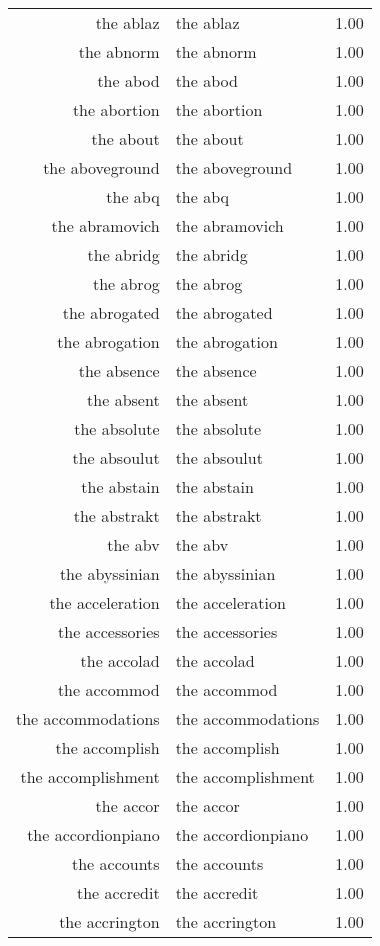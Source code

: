 \begin{table}[ht]
\begin{tabular}{rlr}
  the ablaz & the ablaz & 1.00 \\ 
  the abnorm & the abnorm & 1.00 \\ 
  the abod & the abod & 1.00 \\ 
  the abortion & the abortion & 1.00 \\ 
  the about & the about & 1.00 \\ 
  the aboveground & the aboveground & 1.00 \\ 
  the abq & the abq & 1.00 \\ 
  the abramovich & the abramovich & 1.00 \\ 
  the abridg & the abridg & 1.00 \\ 
  the abrog & the abrog & 1.00 \\ 
  the abrogated & the abrogated & 1.00 \\ 
  the abrogation & the abrogation & 1.00 \\ 
  the absence & the absence & 1.00 \\ 
  the absent & the absent & 1.00 \\ 
  the absolute & the absolute & 1.00 \\ 
  the absoulut & the absoulut & 1.00 \\ 
  the abstain & the abstain & 1.00 \\ 
  the abstrakt & the abstrakt & 1.00 \\ 
  the abv & the abv & 1.00 \\ 
  the abyssinian & the abyssinian & 1.00 \\ 
  the acceleration & the acceleration & 1.00 \\ 
  the accessories & the accessories & 1.00 \\ 
  the accolad & the accolad & 1.00 \\ 
  the accommod & the accommod & 1.00 \\ 
  the accommodations & the accommodations & 1.00 \\ 
  the accomplish & the accomplish & 1.00 \\ 
  the accomplishment & the accomplishment & 1.00 \\ 
  the accor & the accor & 1.00 \\ 
  the accordionpiano & the accordionpiano & 1.00 \\ 
  the accounts & the accounts & 1.00 \\ 
  the accredit & the accredit & 1.00 \\ 
  the accrington & the accrington & 1.00 \\ 

\end{tabular}
\end{table}
